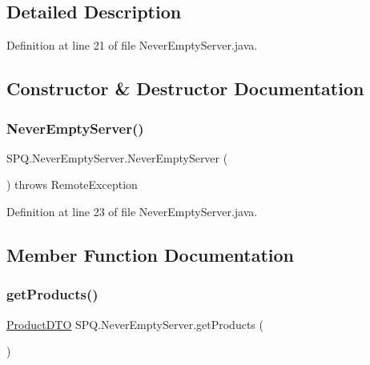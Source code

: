 \subsection{Detailed Description}


Definition at line 21 of file Never\+Empty\+Server.\+java.



\subsection{Constructor \& Destructor Documentation}
\mbox{\label{class_s_p_q_1_1_never_empty_server_a5cec4d4f1ec13bf31974d58182e82170}} 
\subsubsection{\texorpdfstring{Never\+Empty\+Server()}{NeverEmptyServer()}}
{\footnotesize\ttfamily S\+P\+Q.\+Never\+Empty\+Server.\+Never\+Empty\+Server (\begin{DoxyParamCaption}{ }\end{DoxyParamCaption}) throws Remote\+Exception\hspace{0.3cm}{\ttfamily [protected]}}



Definition at line 23 of file Never\+Empty\+Server.\+java.



\subsection{Member Function Documentation}
\mbox{\label{class_s_p_q_1_1_never_empty_server_ad8c5a0afa259c6b8bcc2eb2444742ca2}} 
\subsubsection{\texorpdfstring{get\+Products()}{getProducts()}}
{\footnotesize\ttfamily \mbox{\hyperlink{class_s_p_q_1_1dto_1_1_product_d_t_o}{Product\+D\+TO}} S\+P\+Q.\+Never\+Empty\+Server.\+get\+Products (\begin{DoxyParamCaption}{ }\end{DoxyParamCaption})}



